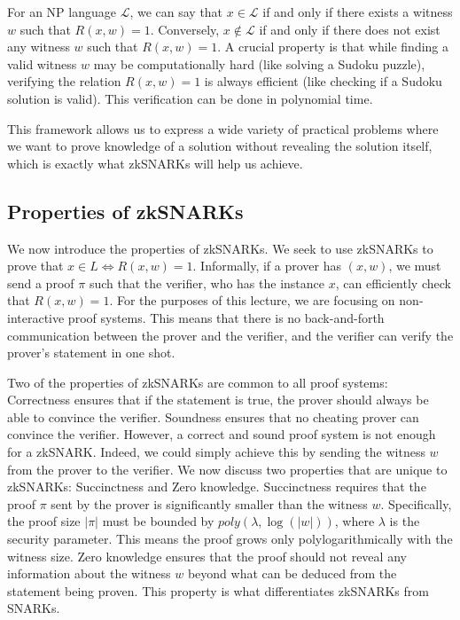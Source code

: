 \documentclass[12pt]{tufte-book}
\begin{document}
For an NP language $\mathcal{L}$, we can say that $x \in \mathcal{L}$ if and only if there exists a witness $w$ such that $R(x, w) = 1$. Conversely, $x \notin \mathcal{L}$ if and only if there does not exist any witness $w$ such that $R(x, w) = 1$. A crucial property is that while finding a valid witness $w$ may be computationally hard (like solving a Sudoku puzzle), verifying the relation $R(x,w)=1$ is always efficient (like checking if a Sudoku solution is valid). This verification can be done in polynomial time.

This framework allows us to express a wide variety of practical problems where we want to prove knowledge of a solution without revealing the solution itself, which is exactly what zkSNARKs will help us achieve.

\subsection{Properties of zkSNARKs}

We now introduce the properties of zkSNARKs. We seek to use zkSNARKs to prove that $x \in L \iff R(x, w) = 1$. Informally, if a prover has $(x, w)$, we must send a proof $\pi$ such that the verifier, who has the instance $x$, can efficiently check that $R(x, w) = 1$. For the purposes of this lecture, we are focusing on non-interactive proof systems. This means that there is no back-and-forth communication between the prover and the verifier, and the verifier can verify the prover's statement in one shot.

Two of the properties of zkSNARKs are common to all proof systems: Correctness ensures that if the statement is true, the prover should always be able to convince the verifier. Soundness ensures that no cheating prover can convince the verifier. However, a correct and sound proof system is not enough for a zkSNARK. Indeed, we could simply achieve this by sending the witness $w$ from the prover to the verifier. We now discuss two properties that are unique to zkSNARKs: Succinctness and Zero knowledge. Succinctness requires that the proof $\pi$ sent by the prover is significantly smaller than the witness $w$. Specifically, the proof size $|\pi|$ must be bounded by $poly(\lambda, \log(|w|))$, where $\lambda$ is the security parameter. This means the proof grows only polylogarithmically with the witness size. Zero knowledge ensures that the proof should not reveal any information about the witness $w$ beyond what can be deduced from the statement being proven. This property is what differentiates zkSNARKs from SNARKs.
\end{document}
